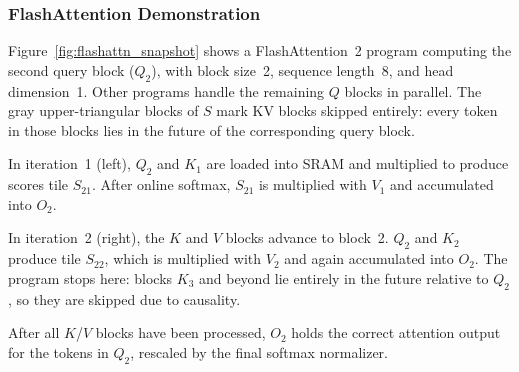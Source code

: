 \subsubsection{FlashAttention Demonstration}

Figure~\ref{fig:flashattn_snapshot} shows a FlashAttention~2 program computing the second query block ($Q_2$), with block size~2, sequence length~8, and head dimension~1. Other programs handle the remaining $Q$ blocks in parallel. The gray upper-triangular blocks of $S$ mark KV blocks skipped entirely: every token in those blocks lies in the future of the corresponding query block.

In iteration~1 (left), $Q_2$ and $K_1$ are loaded into SRAM and multiplied to produce scores tile $S_{21}$. After online softmax, $S_{21}$ is multiplied with $V_1$ and accumulated into $O_2$.

In iteration~2 (right), the $K$ and $V$ blocks advance to block~2. $Q_2$ and $K_2$ produce tile $S_{22}$, which is multiplied with $V_2$ and again accumulated into $O_2$. The program stops here: blocks $K_3$ and beyond lie entirely in the future relative to $Q_2$, so they are skipped due to causality.

After all $K$/$V$ blocks have been processed, $O_2$ holds the correct attention output for the tokens in $Q_2$, rescaled by the final softmax normalizer.


